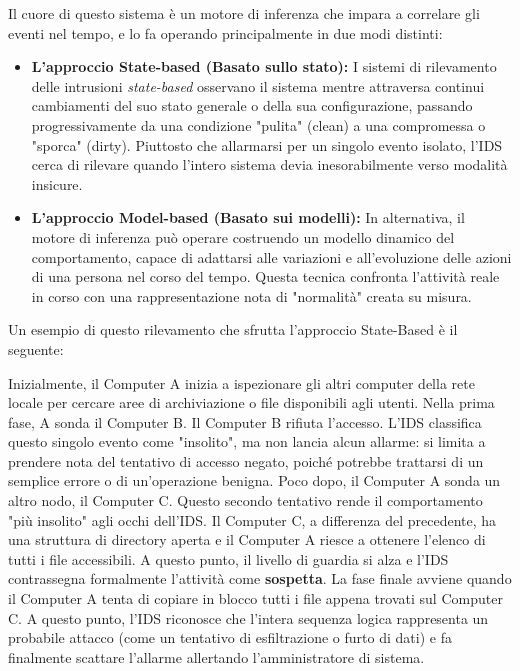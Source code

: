 \documentclass{article}
\begin{document}
Il cuore di questo sistema è un motore di inferenza che impara a correlare gli eventi nel tempo, e lo fa operando principalmente in due modi distinti:

\begin{itemize}
    \item \textbf{L'approccio State-based (Basato sullo stato):} I sistemi di rilevamento delle intrusioni \textit{state-based} osservano il sistema mentre attraversa continui cambiamenti del suo stato generale o della sua configurazione, passando progressivamente da una condizione "pulita" (clean) a una compromessa o "sporca" (dirty). Piuttosto che allarmarsi per un singolo evento isolato, l'IDS cerca di rilevare quando l'intero sistema devia inesorabilmente verso modalità insicure.
    \item \textbf{L'approccio Model-based (Basato sui modelli):} In alternativa, il motore di inferenza può operare costruendo un modello dinamico del comportamento, capace di adattarsi alle variazioni e all'evoluzione delle azioni di una persona nel corso del tempo. Questa tecnica confronta l'attività reale in corso con una rappresentazione nota di "normalità" creata su misura.
\end{itemize}

Un esempio di questo rilevamento che sfrutta l'approccio State-Based è il seguente:

Inizialmente, il Computer A inizia a ispezionare gli altri computer della rete locale per cercare aree di archiviazione o file disponibili agli utenti. Nella prima fase, A sonda il Computer B. Il Computer B rifiuta l'accesso. L'IDS classifica questo singolo evento come "insolito", ma non lancia alcun allarme: si limita a prendere nota del tentativo di accesso negato, poiché potrebbe trattarsi di un semplice errore o di un'operazione benigna. Poco dopo, il Computer A sonda un altro nodo, il Computer C. Questo secondo tentativo rende il comportamento "più insolito" agli occhi dell'IDS. Il Computer C, a differenza del precedente, ha una struttura di directory aperta e il Computer A riesce a ottenere l'elenco di tutti i file accessibili. A questo punto, il livello di guardia si alza e l'IDS contrassegna formalmente l'attività come \textbf{sospetta}. La fase finale avviene quando il Computer A tenta di copiare in blocco tutti i file appena trovati sul Computer C. A questo punto, l'IDS riconosce che l'intera sequenza logica rappresenta un probabile attacco (come un tentativo di esfiltrazione o furto di dati) e fa finalmente scattare l'allarme allertando l'amministratore di sistema.
\end{document}
